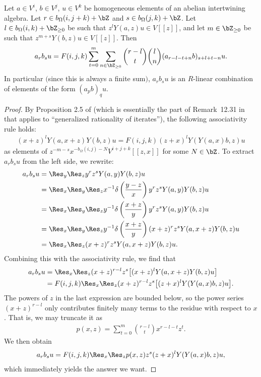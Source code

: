 \begin{lem} \label{lem:shorten-words}
Let $a \in V^i$, $b \in V^j$, $u \in V^k$ be homogeneous elements of an abelian intertwining algebra. Let $r \in b_\Omega(i,j+k)+\bZ$ and $s \in b_\Omega(j,k) + \bZ$. Let $l \in b_\Omega(i,k) + \bZ_{\geq 0}$ be such that $z^l Y(a,z) u \in V[[z]]$, and let $m \in \bZ_{\geq 0}$ be such that $z^{m+s} Y(b,z)u \in V[[z]]$. Then
\begin{gather*} a_r b_s u = F(i,j,k) \sum_{t=0}^m \sum_{n \in \bZ_{\geq 0}} \binom{r-l}{t} \binom{l}{n} (a_{r-l-t+n}b)_{s+l+t-n} u.\end{gather*}
In particular $($since this is always a finite sum$)$, $a_r b_s u$ is an $R$-linear combination of elements of the form $(a_p b)_q u$.
\end{lem}
\begin{proof}By Proposition 2.5 of \cite{L99a} (which is essentially the part of Remark~12.31 in~\cite{DL93} that applies to ``generalized rationality of iterates''), the following associativity rule holds:
\begin{gather*} (x + z)^l Y(a, x + z)Y(b,z)u = F(i,j,k)(z + x)^l Y(Y(a, x)b, z)u \end{gather*}
as elements of $z^{-m-s}x^{-b_\Omega(i,j)-N}V^{i+j+k}[[z,x]]$ for some $N \in \bZ$.
To extract $a_r b_s u$ from the left side, we rewrite:
\begin{align*}
a_r b_s u &= \Res_{y} \Res_{z} y^r z^s Y(a,y) Y(b,z)u \\
&= \Res_{x} \Res_{y} \Res_{z} x^{-1} \delta\left(\frac{y-z}{x} \right) y^r z^s Y(a,y) Y(b,z)u \\
&= \Res_{x} \Res_{y} \Res_{z} y^{-1} \delta\left(\frac{x+z}{y} \right) y^r z^s Y(a,y) Y(b,z)u \\
&= \Res_{x} \Res_{y} \Res_{z} y^{-1} \delta\left(\frac{x+z}{y} \right) (x+z)^r z^s Y(a,x + z) Y(b,z)u \\
&= \Res_{x} \Res_{z} (x+z)^r z^s Y(a,x + z) Y(b,z)u.
\end{align*}
Combining this with the associativity rule, we find that
 \begin{gather*}\begin{split}&
a_r b_s u = \Res_{x} \Res_{z} (x+z)^{r-l} z^s \big[(x+z)^l Y(a,x + z) Y(b,z)u \big] \\
& \hphantom{a_r b_s u }{}= F(i,j,k) \Res_{x} \Res_{z} (x+z)^{r-l} z^s \big[(z+x)^l Y(Y(a, x)b, z)u \big].\end{split}
\end{gather*}
The powers of $z$ in the last expression are bounded below, so the power series $(x+z)^{r-l}$ only contributes finitely many terms to the residue with respect to $x$. That is, we may truncate it as
\begin{gather*} p(x,z) = \sum_{t=0}^m \binom{r-l}{t} x^{r-l-t} z^t.\end{gather*}
We then obtain
\begin{gather*} a_r b_s u = F(i,j,k) \Res_{x} \Res_{z} p(x,z) z^s (z+x)^l Y(Y(a, x)b, z)u ,\end{gather*}
which immediately yields the answer we want.
\end{proof}

